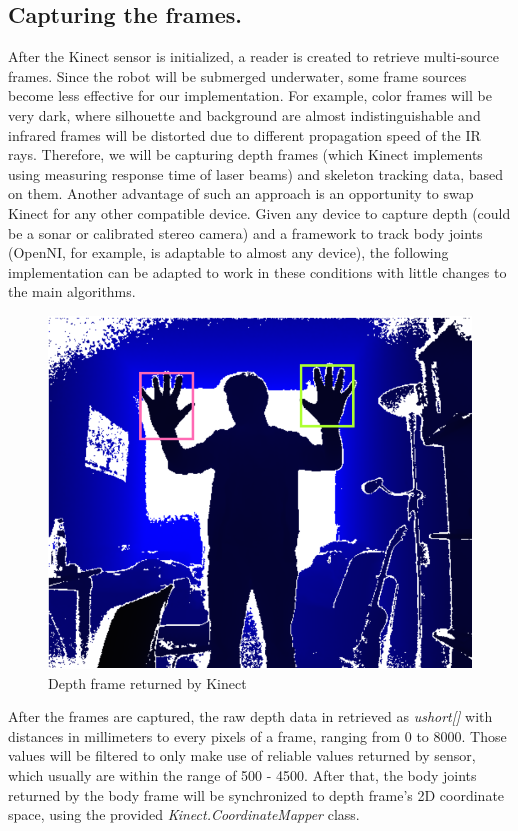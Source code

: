 \documentclass[a4paper,11pt,oneside]{article}
\begin{document}
\subsection{Capturing the frames.}

After the Kinect sensor is initialized, a reader is created to retrieve multi-source frames.  Since the robot will be submerged underwater, some frame sources become less effective for our implementation. For example, color frames will be very dark, where silhouette and background are almost indistinguishable and infrared frames will be distorted due to different propagation speed of the IR rays. Therefore, we will be capturing depth frames (which Kinect implements using measuring response time of laser beams) and skeleton tracking data, based on them. Another advantage of such an approach is an opportunity to swap Kinect for any other compatible device. Given any device to capture depth (could be a sonar or calibrated stereo camera) and a framework to track body joints (OpenNI, for example, is adaptable to almost any device), the following implementation can be adapted to work in these conditions with little changes to the main algorithms.\\

  \begin{figure}[H]
  \centering
  \includegraphics[scale=0.70]{depth-frame.png}
\caption{Depth frame returned by Kinect}
\end{figure}

After the frames are captured, the raw depth data in retrieved as \textit{ushort[]} with distances in millimeters to every pixels of a frame, ranging from 0 to 8000. Those values will be filtered to only make use of reliable values returned by sensor, which usually are within the range of 500 - 4500. After that, the body joints returned by the body frame will be synchronized to depth frame's 2D coordinate space, using the provided \textit{Kinect.CoordinateMapper} class.
\end{document}
